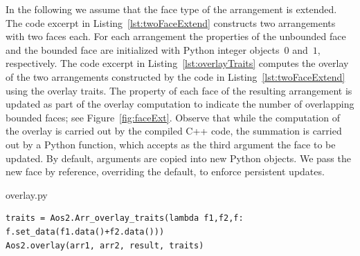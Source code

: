 In the following we assume that the face type of the arrangement
is extended. The code excerpt in Listing~\ref{lst:twoFaceExtend} constructs two arrangements with two faces each. For each arrangement the properties of the unbounded face and the bounded face are initialized with Python integer objects~$0$ and~$1$, respectively.
%
The code excerpt in Listing~\ref{lst:overlayTraits} computes the overlay of the two arrangements constructed by the code in Listing~\ref{lst:twoFaceExtend} using the overlay traits. The property of each face of the resulting arrangement is updated as part of the overlay computation to indicate the number of overlapping bounded faces; see Figure~\ref{fig:faceExt}.
%
Observe that while the computation of the overlay is carried out by the compiled C++ code, the summation is carried out by a Python  function, which accepts as the third argument the face to be updated. By default, arguments are copied into new Python objects. We pass the new face by reference, overriding the default, to enforce persistent updates.

\begin{lstfloat}
  \def\filename{overlay.py}%
  
                  {\pythonDir\filename}
\end{lstfloat}

\begin{lstfloat}
  \begin{lstlisting}[style=pythonFramedStyle,basicstyle=\normalsize,
                     label={lst:overlayTraits},
                     caption={Computing the map overlay of two arrangements using the general overlay traits.}]
traits = Aos2.Arr_overlay_traits(lambda f1,f2,f: f.set_data(f1.data()+f2.data()))
Aos2.overlay(arr1, arr2, result, traits)
  \end{lstlisting}
\end{lstfloat}

